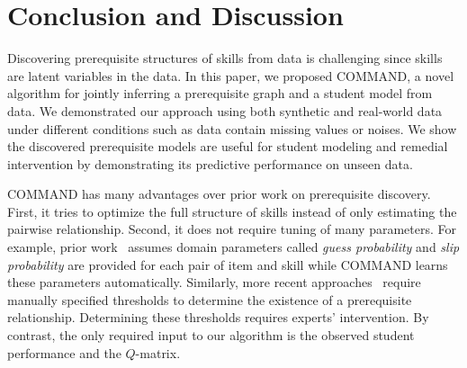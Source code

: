 \documentclass{edm_template}
\begin{document}
	\section{Conclusion and Discussion \label{sec:conclusion}}
	Discovering prerequisite structures of skills from data is challenging since skills are latent variables in the data.
	In this paper, we proposed COMMAND, a novel algorithm for jointly inferring a prerequisite graph and a student model from data.
	We demonstrated our approach using both synthetic and real-world data under different conditions such as data contain missing values or noises.
	We show the discovered prerequisite models are useful for student modeling and remedial intervention by demonstrating its predictive performance on unseen data.
	
	COMMAND has many advantages over prior work on prerequisite discovery. 
	First, it tries to optimize the full structure of skills instead of only estimating the pairwise relationship. 
	Second, it does not require tuning of many parameters.
	For example, prior work~\cite{brunskill2010estimating} assumes domain parameters called \emph{guess probability} and \emph{slip probability}
	are provided for each pair of item and skill while COMMAND learns these parameters automatically.
	Similarly, more recent approaches~\cite{chen2015discovering} require manually specified thresholds to determine the existence of a prerequisite relationship.
	Determining these thresholds requires experts' intervention. 
	By contrast, the only required input to our algorithm is the observed student performance and the $Q$-matrix.
	
	
\end{document}
